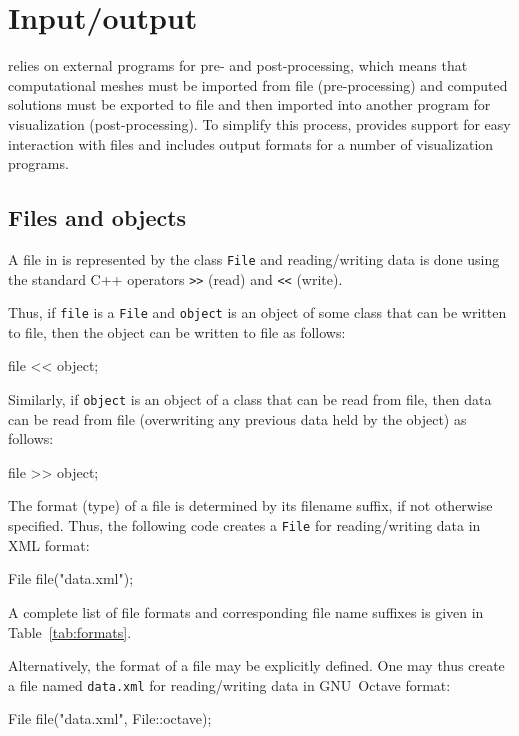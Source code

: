\chapter{Input/output}
\label{chapter:io}

\dolfin{} relies on external programs for pre- and post-processing,
which means that computational meshes must be imported from file
(pre-processing) and computed solutions must be exported to file and
then imported into another program for visualization
(post-processing). To simplify this process, \dolfin{} provides
support for easy interaction with files and includes output formats
for a number of visualization programs.

\section{Files and objects}

A file in \dolfin{} is represented by the class \texttt{File} and
reading/writing data is done using the standard C++ operators
\texttt{>>} (read) and \texttt{<<} (write).

Thus, if \texttt{file} is a \texttt{File} and \texttt{object} is an
object of some class that can be written to file, then the object can
be written to file as follows:
\begin{code}
file << object;
\end{code}
Similarly, if \texttt{object} is an object of a class that can be read
from file, then data can be read from file (overwriting any previous
data held by the object) as follows:
\begin{code}
file >> object;
\end{code}

The format (type) of a file is determined by its filename suffix, if
not otherwise specified. Thus, the following code creates a
\texttt{File} for reading/writing data in \dolfin{} XML format:
\begin{code}
File file("data.xml");
\end{code}
A complete list of file formats and corresponding file name suffixes
is given in Table~\ref{tab:formats}.

Alternatively, the format of a file may be explicitly defined. One may
thus create a file named \texttt{data.xml} for reading/writing data in
GNU~Octave format:
\begin{code}
File file("data.xml", File::octave);
\end{code}

